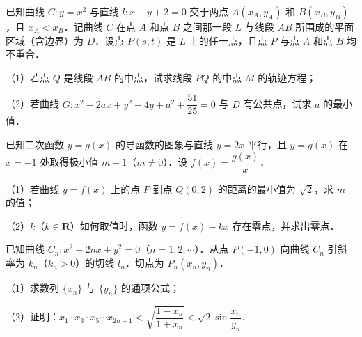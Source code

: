 \endgroup
\begin{question}
已知曲线 $C:y=x^2$ 与直线 $l:x-y+2=0$ 交于两点 $A(x_A,y_A)$ 和 $B(x_B,y_B)$，且 $x_A<x_B$．记曲线 $C$ 在点 $A$ 和点 $B$ 之间那一段 $L$ 与线段 $AB$ 所围成的平面区域（含边界）为 $D$．设点 $P(s,t)$ 是 $L$ 上的任一点，且点 $P$ 与点 $A$ 和点 $B$ 均不重合．

（1）若点 $Q$ 是线段 $AB$ 的中点，试求线段 $PQ$ 的中点 $M$ 的轨迹方程；

（2）若曲线 $G:x^2-2ax+y^2-4y+a^2+\dfrac{51}{25}=0$ 与 $D$ 有公共点，试求 $a$ 的最小值．

\end{question}
\begin{question}
已知二次函数 $y=g(x)$ 的导函数的图象与直线 $y=2x$ 平行，且 $y=g(x)$ 在 $x=-1$ 处取得极小值 $m-1$（$m\neq0$）．设 $f(x)=\dfrac{g(x)}{x}$．

（1）若曲线 $y=f(x)$ 上的点 $P$ 到点 $Q(0,2)$ 的距离的最小值为 $\sqrt2$，求 $m$ 的值；

（2）$k$（$k\in\mathbf R$）如何取值时，函数 $y=f(x)-kx$ 存在零点，并求出零点．

\end{question}
\begin{question}
已知曲线 $C_n:x^2-2nx+y^2=0$（$n=1,2,\cdots$）．从点 $P(-1,0)$ 向曲线 $C_n$ 引斜率为 $k_n$（$k_n>0$）的切线 $l_n$，切点为 $P_n(x_n,y_n)$．

（1）求数列 $\{x_n\}$ 与 $\{y_n\}$ 的通项公式；

（2）证明：$x_1\cdot x_3\cdot x_5\cdots x_{2n-1}<\sqrt{\dfrac{1-x_n}{1+x_n}}<\sqrt2\sin\dfrac{x_n}{y_n}$．

\end{question}
